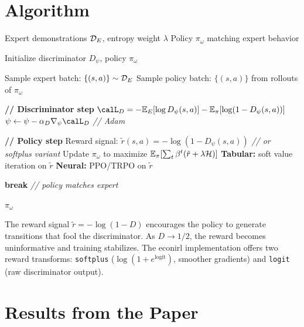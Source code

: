 \documentclass[11pt]{article}
\begin{document}
\section{Algorithm}

\begin{algorithm}[h!]
\caption{GAIL (Ho \& Ermon 2016, Algorithm 1)}
\label{alg:gail}
\begin{algorithmic}[1]
\REQUIRE Expert demonstrations $\mathcal{D}_E$, entropy weight $\lambda$
\ENSURE Policy $\pi_\omega$ matching expert behavior

\STATE Initialize discriminator $D_\psi$, policy $\pi_\omega$


\STATE Sample expert batch: $\{(s,a)\} \sim \mathcal{D}_E$
\STATE Sample policy batch: $\{(s,a)\}$ from rollouts of $\pi_\omega$

\STATE \textbf{// Discriminator step}
\STATE $\calL_D = -\E_E[\log D_\psi(s,a)] - \E_\pi[\log(1 - D_\psi(s,a))]$
\STATE $\psi \leftarrow \psi - \alpha_D \nabla_\psi \calL_D$ \hfill \textit{// Adam}

\STATE \textbf{// Policy step}
\STATE Reward signal: $\tilde{r}(s,a) = -\log(1 - D_\psi(s,a))$ \hfill \textit{// or softplus variant}
\STATE Update $\pi_\omega$ to maximize $\mathbb{E}_\pi[\sum_t \beta^t (\tilde{r} + \lambda \mathcal{H})]$
\STATE \quad \textbf{Tabular:} soft value iteration on $\tilde{r}$
\STATE \quad \textbf{Neural:} PPO/TRPO on $\tilde{r}$ \citep{schulman2017}

  \STATE \textbf{break} \hfill \textit{// policy matches expert}
\ENDIF

\ENDFOR
\RETURN $\pi_\omega$ 
\end{algorithmic}
\end{algorithm}
\FloatBarrier

The reward signal $\tilde{r} = -\log(1 - D)$ encourages the policy to generate transitions that fool the discriminator.
As $D \to 1/2$, the reward becomes uninformative and training stabilizes.
The econirl implementation offers two reward transforms: \texttt{softplus} ($\log(1 + e^{\text{logit}})$, smoother gradients) and \texttt{logit} (raw discriminator output).

\section{Results from the Paper}
\end{document}
